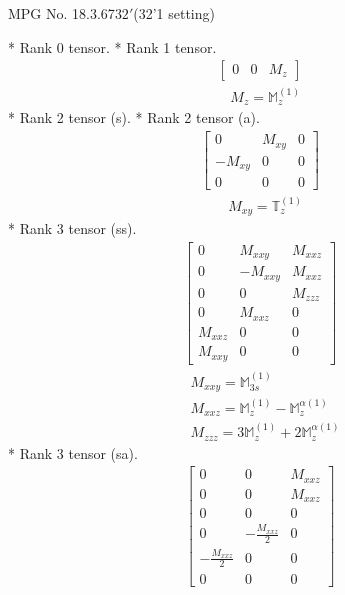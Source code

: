 \documentclass[fleqn,8pt,landscape]{jsarticle}
\begin{document}
\setcounter{MaxMatrixCols}{32}

\renewcommand{\tablename}{Table~}
\renewcommand{\figurename}{Figure~}
\begin{center}
\LARGE
MPG No. 18.3.67\quad$32'$\quad(32'1 setting)
\end{center}
* Rank 0 tensor.
* Rank 1 tensor.
\begin{align*}
\begin{bmatrix} 0 & 0 & M_{z} \end{bmatrix}
\end{align*}
\begin{align*}
& M_{z} = \mathbb{M}_{z}^{(1)}
\end{align*}
* Rank 2 tensor (s).
* Rank 2 tensor (a).
\begin{align*}
\begin{bmatrix} 0 & M_{xy} & 0 \\ - M_{xy} & 0 & 0 \\ 0 & 0 & 0 \end{bmatrix}
\end{align*}
\begin{align*}
& M_{xy} = \mathbb{T}_{z}^{(1)}
\end{align*}
* Rank 3 tensor (ss).
\begin{align*}
\begin{bmatrix} 0 & M_{xxy} & M_{xxz} \\ 0 & - M_{xxy} & M_{xxz} \\ 0 & 0 & M_{zzz} \\ 0 & M_{xxz} & 0 \\ M_{xxz} & 0 & 0 \\ M_{xxy} & 0 & 0 \end{bmatrix}
\end{align*}
\begin{align*}
& M_{xxy} = \mathbb{M}_{3s}^{(1)} \\
& M_{xxz} = \mathbb{M}_{z}^{(1)} - \mathbb{M}_{z}^{\alpha(1)} \\
& M_{zzz} = 3 \mathbb{M}_{z}^{(1)} + 2 \mathbb{M}_{z}^{\alpha(1)}
\end{align*}
* Rank 3 tensor (sa).
\begin{align*}
\begin{bmatrix} 0 & 0 & M_{xxz} \\ 0 & 0 & M_{xxz} \\ 0 & 0 & 0 \\ 0 & - \frac{M_{xxz}}{2} & 0 \\ - \frac{M_{xxz}}{2} & 0 & 0 \\ 0 & 0 & 0 \end{bmatrix}
\end{align*}
\end{document}
